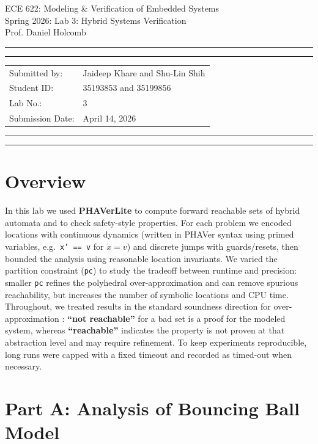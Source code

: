 \documentclass[10pt]{article}
\newcommand{\studentname}{Jaideep Khare and Shu-Lin Shih}
\newcommand{\studentnumber}{35193853 and 35199856}
\newcommand{\coursename}{ECE 622: Modeling \& Verification of Embedded Systems}
\newcommand{\semester}{Spring 2026}
\begin{document}
\begin{center}
{\huge{\coursename}} \\
\vspace{2mm}
{\Large{\semester: Lab 3: Hybrid Systems Verification}}\\
\vspace{1mm}
{\Large{Prof. Daniel Holcomb}}
\end{center}

\vspace{5mm}
\hrule
\vspace{1mm}
\hrule

\vspace{3mm}
\begin{tabular}{ll}
Submitted by:   & {\studentname} \\
Student ID:      & {\studentnumber} \\
Lab No.:         & 3 \\
Submission Date: & April 14, 2026 \\
\end{tabular}

\vspace{3mm}
\hrule
\vspace{1mm}
\hrule

\section*{Overview}
In this lab we used \textbf{PHAVerLite} to compute forward reachable sets of hybrid automata and to check safety-style properties. For each problem we encoded locations with continuous dynamics (written in PHAVer syntax using primed variables, e.g.\ \texttt{x' == v} for $\dot{x}=v$) and discrete jumps with guards/resets, then bounded the analysis using reasonable location invariants. We varied the partition constraint (\texttt{pc}) to study the tradeoff between runtime and precision: smaller \texttt{pc} refines the polyhedral over-approximation and can remove spurious reachability, but increases the number of symbolic locations and CPU time. Throughout, we treated results in the standard soundness direction for over-approximation \citep{Frehse2008STTT}: \textbf{``not reachable''} for a bad set is a proof for the modeled system, whereas \textbf{``reachable''} indicates the property is not proven at that abstraction level and may require refinement. To keep experiments reproducible, long runs were capped with a fixed timeout and recorded as timed-out when necessary.

\section{Part A: Analysis of Bouncing Ball Model}
\end{document}
